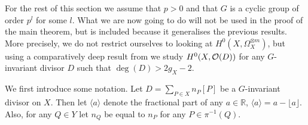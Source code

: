 For the rest of this section we assume that $p>0$ and that $G$ is a cyclic group of order $p^l$ for some $l$.
What we are now going to do will not be used in the proof of the main theorem, but is included because it generalises the previous results.
More precisely, we do not restrict ourselves to looking at $H^0(X,\Omega_X^{\otimes m})$, but using a comparatively deep result from \cite{kako} we study $H^0(X,{\cal O}(D))$ for any $G$-invariant divisor $D$ such that $\deg(D)>2g_X-2$.


We first introduce some notation.
Let $D = \sum_{P\in X} n_P[P]$ be a $G$-invariant divisor on $X$.
Then let $\langle a \rangle$ denote the fractional part of any $a\in \mathbb{R}$, \ie $\langle a \rangle = a - \lfloor a \rfloor$.
Also, for any $Q\in Y$ let $n_Q$ be equal to $n_P$ for any $P\in \pi^{-1}(Q)$.




